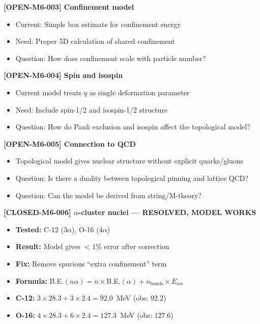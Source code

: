 \begin{tcolorbox}[colback=orange!5!white, colframe=orange!75!black, breakable, title=Open Questions from Topological Pinning Model]
\textbf{[OPEN-M6-003] Confinement model}
\begin{itemize}
    \item Current: Simple box estimate for confinement energy
    \item Need: Proper 5D calculation of shared confinement
    \item Question: How does confinement scale with particle number?
\end{itemize}

\textbf{[OPEN-M6-004] Spin and isospin}
\begin{itemize}
    \item Current model treats $q$ as single deformation parameter
    \item Need: Include spin-1/2 and isospin-1/2 structure
    \item Question: How do Pauli exclusion and isospin affect the topological model?
\end{itemize}

\textbf{[OPEN-M6-005] Connection to QCD}
\begin{itemize}
    \item Topological model gives nuclear structure without explicit quarks/gluons
    \item Question: Is there a duality between topological pinning and lattice QCD?
    \item Question: Can the model be derived from string/M-theory?
\end{itemize}

\textbf{[CLOSED-M6-006] $\alpha$-cluster nuclei --- RESOLVED, MODEL WORKS}
\begin{itemize}
    \item \textbf{Tested:} C-12 ($3\alpha$), O-16 ($4\alpha$)
    \item \textbf{Result:} Model gives $<1\%$ error after correction
    \item \textbf{Fix:} Remove spurious ``extra confinement'' term
    \item \textbf{Formula:} B.E.$(n\alpha) = n \times$B.E.$(\alpha) + n_{\text{bonds}} \times E_{\alpha\alpha}$
    \item \textbf{C-12:} $3 \times 28.3 + 3 \times 2.4 = 92.0$~MeV (obs: 92.2)
    \item \textbf{O-16:} $4 \times 28.3 + 6 \times 2.4 = 127.3$~MeV (obs: 127.6)
\end{itemize}


\end{tcolorbox}
